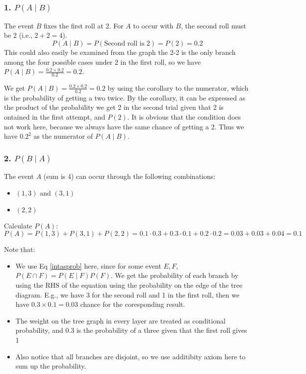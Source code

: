 \begin{solution}
    \subsubsection*{1. \( P(A \mid B) \)}
    The event \( B \) fixes the first roll at 2. For \( A \) to occur with \( B \), the second roll must be 2 (i.e., \( 2 + 2 = 4 \)).
    \[ P(A \mid B) = P(\text{Second roll is 2}) = P(2) = 0.2 \]
    This could also easily be examined from the graph the 2-2 is the only branch among the four possible cases under 2 in the first roll, so we have $P(A \mid B) = \frac{0.2\times 0.2}{0.2}=0.2$.
    \begin{remark}
        We get $P(A \mid B) = \frac{0.2\times 0.2}{0.2}=0.2$ by using the corollary to the numerator, which is the probability of getting a two twice. 
        By the corollary, it can be expressed as the product of the probability we get 2 in the second trial given that 2 is ontained in the first attempt, and $P(2)$.
        It is obvious that the condition does not work here, because we always have the same chance of getting a 2. Thus we have $0.2^2$ as the numerator of $P(A \mid B)$.
    \end{remark}
    \subsubsection*{2. \( P(B \mid A) \)}
    The event \( A \) (sum is 4) can occur through the following combinations:
    \begin{itemize}
        \item \( (1, 3) \) and \( (3, 1) \)
        \item \( (2, 2) \)
    \end{itemize}
    
    Calculate \( P(A) \):
    \[ P(A) = P(1, 3) + P(3, 1) + P(2, 2) = 0.1 \cdot 0.3 + 0.3 \cdot 0.1 + 0.2 \cdot 0.2 = 0.03 + 0.03 + 0.04 = 0.1 \]
    \begin{remark}
        Note that: 
        \begin{itemize}
            \item We use Eq \ref{intasprob} here, since for some event $E,F$, $P(E\cap F) = P(E \mid F)P(F)$.
            We get the probability of each branch by using the RHS of the equation using the probability on the edge of the tree 
            diagram. E.g., we have 3 for the second roll and 1 in the first roll, then we have $0.3\times 0.1 = 0.03$ chance for the coresponding result.
            \item The weight on the tree graph in every layer are treated as conditional probability, and 0.3 is the probability of a three given that the first roll gives 1
            \item Also notice that all branches are disjoint, so we use additibity axiom here to 
            sum up the probability.
        \end{itemize}


\end{remark}
\end{solution}
